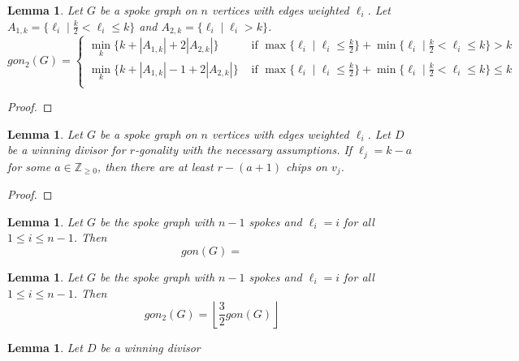 \documentclass{article}
\newtheorem{lemma}[theorem]{Lemma}
\theoremstyle{definition}
\begin{document}
\begin{lemma}
    Let $G$ be a spoke graph on $n$ vertices with edges weighted $\ell_i$. Let $A_{1,k} = \{\ell_i \mid \frac{k}{2}<\ell_i\leq k \}$ and $A_{2,k} = \{ \ell_i \mid \ell_i>k \}$.  
    $$gon_2(G) =\begin{cases}
         \min_{k}\{k + |A_{1,k}| +2|A_{2,k}|\} & \text{ if } \max\{\ell_i \mid \ell_i \leq \frac{k}{2}\} +\min\{ \ell_i \mid \frac{k}{2}<\ell_i\leq k \}>k \\
         \min_{k}\{k + |A_{1,k}|-1 +2|A_{2,k}|\} & \text{ if } \max\{\ell_i \mid \ell_i \leq \frac{k}{2}\} +\min\{ \ell_i \mid \frac{k}{2}<\ell_i\leq k \}\leq k \\
    \end{cases}$$
\end{lemma}
\begin{proof}
    
\end{proof}

\begin{lemma}
    Let $G$ be a spoke graph on $n$ vertices with edges weighted $\ell_i$. Let $D$ be a winning divisor for $r$-gonality with the necessary assumptions. If $\ell_j=k-a$ for some $a\in \mathbb{Z}_{\geq 0}$, then there are at least $r-(a+1)$ chips on $v_j$.
\end{lemma}
\begin{proof}
    
\end{proof}

\begin{lemma}
    Let $G$ be the spoke graph with $n-1$ spokes and $\ell_i = i$ for all $1\leq i \leq n-1$. Then
    $$gon(G) = $$
\end{lemma}

\begin{lemma}
    Let $G$ be the spoke graph with $n-1$ spokes and $\ell_i = i$ for all $1\leq i \leq n-1$. Then
    $$gon_2(G) = \left\lfloor \frac{3}{2} gon(G) \right\rfloor$$
\end{lemma}

\begin{lemma}
    Let $D$ be a winning divisor
\end{lemma}
\end{document}
